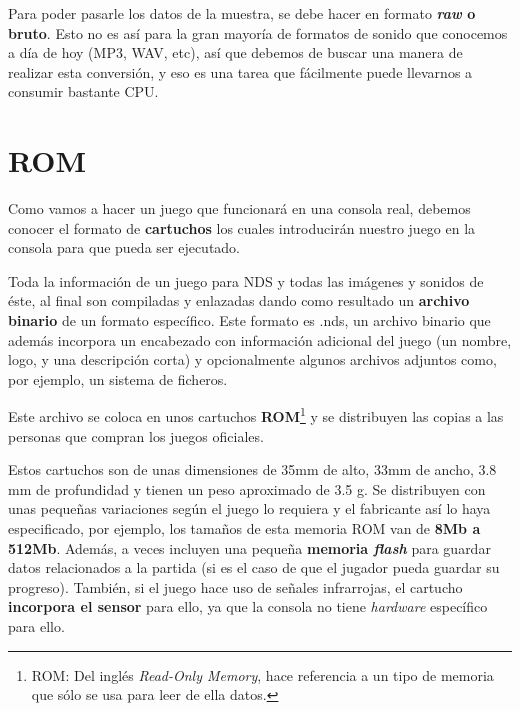 Para poder pasarle los datos de la muestra, se debe hacer en formato \textbf{\textit{raw} o bruto}. Esto no es así para la gran mayoría de formatos de sonido que conocemos a día de hoy (MP3, WAV, etc), así que debemos de buscar una manera de realizar esta conversión, y eso es una tarea que fácilmente puede llevarnos a consumir bastante CPU.

\vspace{1cm}

\section{ROM}

Como vamos a hacer un juego que funcionará en una consola real, debemos conocer el formato de \textbf{cartuchos} los cuales introducirán nuestro juego en la consola para que pueda ser ejecutado.

\vspace{0.5cm}

Toda la información de un juego para NDS y todas las imágenes y sonidos de éste, al final son compiladas y enlazadas dando como resultado un \textbf{archivo binario} de un formato específico. Este formato es .nds, un archivo binario que además incorpora un encabezado con información adicional del juego (un nombre, logo, y una descripción corta) y opcionalmente algunos archivos adjuntos como, por ejemplo, un sistema de ficheros.

\vspace{0.5cm}

Este archivo se coloca en unos cartuchos \textbf{ROM}\footnote{ROM: Del inglés \textit{Read-Only Memory}, hace referencia a un tipo de memoria que sólo se usa para leer de ella datos.} y se distribuyen las copias a las personas que compran los juegos oficiales. 

\vspace{0.5cm}

Estos cartuchos son de unas dimensiones de 35mm de alto, 33mm de ancho, 3.8 mm de profundidad y tienen un peso aproximado de 3.5 g. Se distribuyen con unas pequeñas variaciones según el juego lo requiera y el fabricante así lo haya especificado, por ejemplo, los tamaños de esta memoria ROM van de \textbf{8Mb a 512Mb}. Además, a veces incluyen una pequeña \textbf{memoria \textit{flash}} para guardar datos relacionados a la partida (si es el caso de que el jugador pueda guardar su progreso). También, si el juego hace uso de señales infrarrojas, el cartucho \textbf{incorpora el sensor} para ello, ya que la consola no tiene \textit{hardware} específico para ello.

